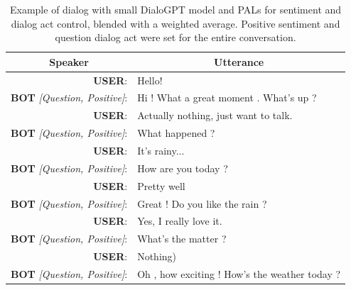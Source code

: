 \documentclass[11pt]{article}
\begin{document}
\begin{table}[]
\begin{tabular}{rl}
\multicolumn{1}{c}{Speaker}   & \multicolumn{1}{c}{Utterance}                 \\ \hline
\textbf{USER}:                         & Hello!                                        \\
\textbf{BOT} \textit{{[}Question, Positive{]}}: & Hi ! What a great moment . What's up ?        \\
\textbf{USER}:                         & Actually nothing, just want to talk.          \\
\textbf{BOT} \textit{{[}Question, Positive{]}}: & What happened ?                               \\
\textbf{USER}:                         & It's rainy...                                 \\
\textbf{BOT} \textit{{[}Question, Positive{]}}: & How are you today ?                           \\
\textbf{USER}:                         & Pretty well                                   \\
\textbf{BOT} \textit{{[}Question, Positive{]}}: & Great ! Do you like the rain ?                \\
\textbf{USER}:                         & Yes, I really love it.                        \\
\textbf{BOT} \textit{{[}Question, Positive{]}}: & What's the matter ?                           \\
\textbf{USER}:                         & Nothing)                                      \\
\textbf{BOT} \textit{{[}Question, Positive{]}}: & Oh , how exciting ! How's the weather today ?
\end{tabular}
\caption{Example of dialog with small DialoGPT model and PALs for sentiment and dialog act control, blended with a weighted average. Positive sentiment and question dialog act were set for the entire conversation.}
\label{tab:example_pos_question_dialog}
\end{table}
\end{document}
